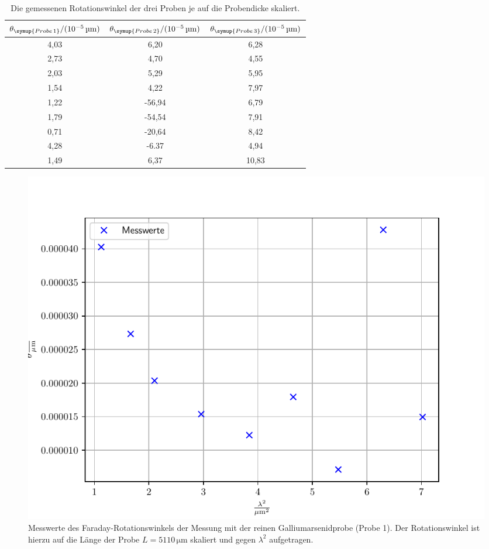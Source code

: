 \FloatBarrier
\begin{table}[h]
    \centering
    \caption{Die gemessenen Rotationswinkel der drei Proben je auf die Probendicke skaliert.}
    \label{tab:atab4}
    \begin{tabular}{c c c}
        \toprule
        {$\theta_{\symup{Probe\,1}}/(10^{-5}\,\si{\micro\meter})$} & {$\theta_{\symup{Probe\,2}}/(10^{-5}\,\si{\micro\meter})$} & {$\theta_{\symup{Probe\,3}}/(10^{-5}\,\si{\micro\meter})$}\\
        \midrule
        4,03  & 6,20   &  6,28 \\
        2,73  & 4,70   &  4,55 \\
        2,03  & 5,29   &  5,95 \\
        1,54  & 4,22   &  7,97 \\
        1,22  & -56,94 &  6,79 \\
        1,79  & -54,54 &  7,91 \\
        0,71  & -20,64 &  8,42 \\
        4,28  & -6.37  &  4,94 \\
        1,49  & 6,37   &  10,83 \\
        \bottomrule 
    \end{tabular}
\end{table}
\FloatBarrier
\noindent
\FloatBarrier
\begin{figure}[h]
    \centering
    \includegraphics[width=1\textwidth]{Winkel_undotiert.pdf}
    \caption{Messwerte des Faraday-Rotationswinkels der Messung mit der reinen Galliumarsenidprobe (Probe 1). Der Rotationswinkel ist hierzu auf die Länge der Probe $L = 5110\, \si{\micro\meter}$ skaliert und gegen $\lambda ^2$ aufgetragen.}
    \label{fig:afig2}
\end{figure}
\FloatBarrier
\noindent


